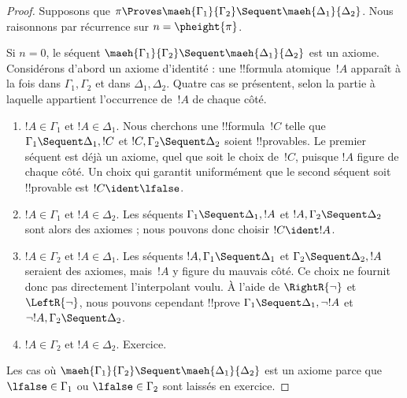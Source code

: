 \documentclass[../../../include/open-logic-section]{subfiles}
\begin{document}
\begin{proof}
Supposons que $\pi \Proves \maeh{\Gamma_1}{\Gamma_2} \Sequent
\maeh{\Delta_1}{\Delta_2}$. Nous raisonnons par récurrence sur
$n=\pheight{\pi}$.

Si $n=0$, le séquent $\maeh{\Gamma_1}{\Gamma_2} \Sequent
\maeh{\Delta_1}{\Delta_2}$ est un axiome. Considérons d'abord un axiome
d'identité : une !!{formula} atomique~$!A$ apparaît à la fois dans
$\Gamma_1, \Gamma_2$ et dans $\Delta_1, \Delta_2$.
Quatre cas se présentent, selon la partie à laquelle appartient
l'occurrence de~$!A$ de chaque côté.
\begin{enumerate}
\item $!A \in \Gamma_1$ et $!A \in \Delta_1$. Nous cherchons une
!!{formula}~$!C$ telle que $\Gamma_1 \Sequent \Delta_1, !C$ et
$!C, \Gamma_2 \Sequent \Delta_2$ soient !!{provable}s. Le premier
séquent est déjà un axiome, quel que soit le choix de~$!C$, puisque
$!A$ figure de chaque côté. Un choix qui garantit uniformément que
le second séquent soit !!{provable} est $!C \ident \lfalse$.
\item $!A \in \Gamma_1$ et $!A \in \Delta_2$. Les séquents
$\Gamma_1 \Sequent \Delta_1, !A$ et $!A, \Gamma_2 \Sequent \Delta_2$
sont alors des axiomes ; nous pouvons donc choisir $!C \ident !A$.
\item $!A \in \Gamma_2$ et $!A \in \Delta_1$. Les séquents
$!A, \Gamma_1 \Sequent \Delta_1$ et
$\Gamma_2 \Sequent \Delta_2, !A$ seraient des axiomes, mais~$!A$
y figure du mauvais côté. Ce choix ne fournit donc pas directement
l'interpolant voulu. À l'aide de $\RightR{\lnot}$ et
$\LeftR{\lnot}$, nous pouvons cependant !!{prove}
$\Gamma_1 \Sequent \Delta_1, \lnot!A$ et
$\lnot !A, \Gamma_2 \Sequent \Delta_2$.
\item $!A \in \Gamma_2$ et $!A \in \Delta_2$. Exercice.
\end{enumerate}
Les cas où $\maeh{\Gamma_1}{\Gamma_2} \Sequent
\maeh{\Delta_1}{\Delta_2}$ est un axiome parce que
$\lfalse \in \Gamma_1$ ou $\lfalse \in \Gamma_2$ sont laissés en exercice.


\end{proof}
\end{document}
